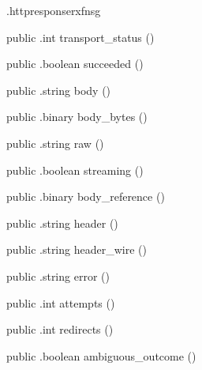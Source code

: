 \begin{CrexxClass}{.httpresponse}{rxfnsg}
\begin{Members}
    \Method
      {public}
      {.int}
      {transport\_status}
      {()}

    \Method
      {public}
      {.boolean}
      {succeeded}
      {()}

    \Method
      {public}
      {.string}
      {body}
      {()}

    \Method
      {public}
      {.binary}
      {body\_bytes}
      {()}

    \Method
      {public}
      {.string}
      {raw}
      {()}

    \Method
      {public}
      {.boolean}
      {streaming}
      {()}

    \Method
      {public}
      {.binary}
      {body\_reference}
      {()}

    \Method
      {public}
      {.string}
      {header}
      {()}

    \Method
      {public}
      {.string}
      {header\_wire}
      {()}

    \Method
      {public}
      {.string}
      {error}
      {()}

    \Method
      {public}
      {.int}
      {attempts}
      {()}

    \Method
      {public}
      {.int}
      {redirects}
      {()}

    \Method
      {public}
      {.boolean}
      {ambiguous\_outcome}
      {()}

  \end{Members}
\end{CrexxClass}

